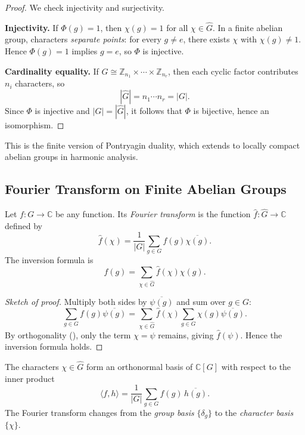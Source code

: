 \begin{proof}
We check injectivity and surjectivity.

\smallskip
\noindent\textbf{Injectivity.}
If $\Phi(g)=1$, then $\chi(g)=1$ for all $\chi\in\widehat{G}$.  
In a finite abelian group, characters \emph{separate points}: for every $g\ne e$, there exists $\chi$ with $\chi(g)\ne1$.  
Hence $\Phi(g)=1$ implies $g=e$, so $\Phi$ is injective.

\smallskip
\noindent\textbf{Cardinality equality.}
If $G\cong\mathbb{Z}_{n_1}\times\cdots\times\mathbb{Z}_{n_r}$,  
then each cyclic factor contributes $n_i$ characters, so
\[
|\widehat{G}|=n_1\cdots n_r=|G|.
\]
\smallskip
\noindent Since $\Phi$ is injective and $|G|=|\widehat{G}|$, it follows that $\Phi$ is bijective, hence an isomorphism.
\end{proof}

\begin{remark}
This is the finite version of Pontryagin duality, which extends to locally compact abelian groups in harmonic analysis.
\end{remark}

\subsection{Fourier Transform on Finite Abelian Groups}

\begin{definition}\label{def:fourier}
Let $f:G\to\mathbb{C}$ be any function.  
Its \emph{Fourier transform} is the function $\widehat{f}:\widehat{G}\to\mathbb{C}$ defined by
\[
\widehat{f}(\chi)=\frac{1}{|G|}\sum_{g\in G} f(g)\overline{\chi(g)}.
\]
The inversion formula is
\[
f(g)=\sum_{\chi\in\widehat{G}}\widehat{f}(\chi)\chi(g).
\]
\end{definition}

\begin{proof}[Sketch of proof]
Multiply both sides by $\overline{\psi(g)}$ and sum over $g\in G$:
\[
\sum_{g\in G}f(g)\overline{\psi(g)} 
= \sum_{\chi\in\widehat{G}}\widehat{f}(\chi)\sum_{g\in G}\chi(g)\overline{\psi(g)}.
\]
By orthogonality (), only the term $\chi=\psi$ remains, giving $\widehat{f}(\psi)$.  
Hence the inversion formula holds.
\end{proof}

\begin{remark}
The characters $\chi\in\widehat{G}$ form an orthonormal basis of $\mathbb{C}[G]$ with respect to the inner product
\[
\langle f,h\rangle = \frac{1}{|G|}\sum_{g\in G} f(g)\,\overline{h(g)}.
\]
The Fourier transform changes from the \emph{group basis} $\{\delta_g\}$ to the \emph{character basis} $\{\chi\}$.
\end{remark}

